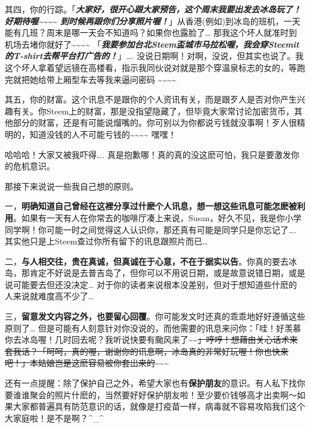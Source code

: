 \documentclass[]{ctexbook}
\begin{document}
其四，你的行踪。「\textbf{\emph{大家好，很开心跟大家预告，这个周末我要出发去冰岛玩了！好期待喔\textasciitilde{}\textasciitilde{}\textasciitilde{}\textasciitilde{} 到时候再跟你们分享照片喔！}}」从香港(例如)到冰岛的班机，一天能有几班？周末是哪一天会不知道吗？如果你也露脸了\ldots{} 那我这个坏人就准时到机场去堵你就好了\textasciitilde{}\textasciitilde{}\textasciitilde{}\textasciitilde{} 「\textbf{\emph{我要参加台北Steem盃城市马拉松喔，我会穿Steemit的T-shirt去帮平台打广告的！}}」\ldots{}. 没说日期啊！对啊，没说，但其实也说了。我这个坏人拿着望远镜在高楼看，指示我同伙说对就是那个穿温泉标志的女的，等跑完就把她给带上厢型车去等我来逼问密码 \textasciitilde{}\textasciitilde{}\textasciitilde{}\textasciitilde{}

其五，你的财富。这个讯息不是跟你的个人资讯有关，而是跟歹人是否对你产生兴趣有关。你Steem上的财富，那是没指望隐藏了，但毕竟大家常讨论加密货币，其他部分的财富，还是有可能说熘嘴的。你可别以为你都说亏钱就没事啊！歹人很精明的，知道没钱的人不可能亏钱的\textasciitilde{}\textasciitilde{}\textasciitilde{}\textasciitilde{} 嘿嘿！

哈哈哈！大家又被我吓得\ldots{}. 真是抱歉哪！真的真的没这麽可怕，我只是要激发你的危机意识。

那接下来说说一些我自己想的原则。

一，\textbf{明确知道自己曾经在这裡分享过什麽个人讯息，想一想这些讯息可能怎麽被利用}。如果有一天有人在你常去的咖啡厅凑上来说，Susan，好久不见，我是你小学同学啊！你可能一时之间觉得这人认识你，那还真有可能是同学只是你忘记了\ldots{}. 其实他只是上Steem查过你所有留下的讯息跟照片而已\ldots{}

二，\textbf{与人相交往，贵在真诚，但真诚在于心意，不在于据实以告}。你真的要去冰岛，那肯定不好说是去普吉岛了，但你可以不用说日期，或是故意说错日期，或是说可能要去但还没决定\ldots{} 对于你的读者来说根本没差别，但对于想知道些什麽的人来说就难度高不少了\ldots{}

三，\textbf{留意发文内容之外，也要留心回覆}。你可能发文时还真的乖乖地好好遵循这些原则了\ldots{} 但是可能有人刻意针对你没说的，而他需要的讯息来问你：「哇！好羡慕你去冰岛喔！几时回去呢？我听说快要有颱风来了\textasciitilde{}\textasciitilde{}\sout{」哼哼！想藉由关心话术来套我话？「呵呵，真的喔，谢谢你的讯息啊，冰岛真的非常好玩喔！你也快来吧！」本姑娘岂是这麽容易被你套出来的}\textasciitilde{}\textasciitilde{}\textasciitilde{}

还有一点提醒：除了保护自己之外，希望大家也有\textbf{保护朋友}的意识。有人私下找你要谁谁聚会的照片什麽的，当然要好好保护朋友啦！至少要价钱够高才出卖啊～如果大家都普遍具有防范意识的话，就像是打疫苗一样，病毒就不容易攻陷我们这个大家庭啦！是不是啊？\^{}\_\^{}
\end{document}
